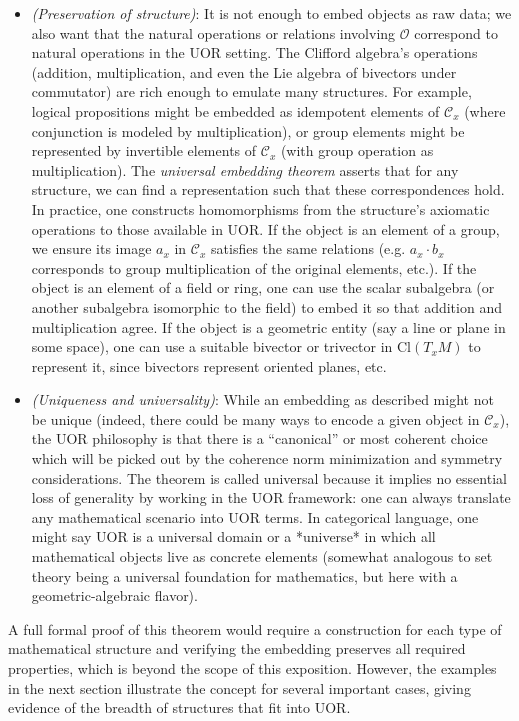 \documentclass[12pt]{article}
\newcommand{\Cl}{\mathrm{Cl}}
\begin{document}
\begin{itemize}
\begin{itemize}
       \item \textit{(Preservation of structure)}: It is not enough to embed objects as raw data; we also want that the natural operations or relations involving $\mathcal{O}$ correspond to natural operations in the UOR setting. The Clifford algebra’s operations (addition, multiplication, and even the Lie algebra of bivectors under commutator) are rich enough to emulate many structures. For example, logical propositions might be embedded as idempotent elements of $\mathcal{C}_x$ (where conjunction is modeled by multiplication), or group elements might be represented by invertible elements of $\mathcal{C}_x$ (with group operation as multiplication). The \textit{universal embedding theorem} asserts that for any structure, we can find a representation such that these correspondences hold. In practice, one constructs homomorphisms from the structure’s axiomatic operations to those available in UOR. If the object is an element of a group, we ensure its image $a_x$ in $\mathcal{C}_x$ satisfies the same relations (e.g. $a_x \cdot b_x$ corresponds to group multiplication of the original elements, etc.). If the object is an element of a field or ring, one can use the scalar subalgebra (or another subalgebra isomorphic to the field) to embed it so that addition and multiplication agree. If the object is a geometric entity (say a line or plane in some space), one can use a suitable bivector or trivector in $\Cl(T_xM)$ to represent it, since bivectors represent oriented planes, etc.
       \item \textit{(Uniqueness and universality)}: While an embedding as described might not be unique (indeed, there could be many ways to encode a given object in $\mathcal{C}_x$), the UOR philosophy is that there is a “canonical” or most coherent choice which will be picked out by the coherence norm minimization and symmetry considerations. The theorem is called universal because it implies no essential loss of generality by working in the UOR framework: one can always translate any mathematical scenario into UOR terms. In categorical language, one might say UOR is a universal domain or a *universe* in which all mathematical objects live as concrete elements (somewhat analogous to set theory being a universal foundation for mathematics, but here with a geometric-algebraic flavor).
    \end{itemize}
    A full formal proof of this theorem would require a construction for each type of mathematical structure and verifying the embedding preserves all required properties, which is beyond the scope of this exposition. However, the examples in the next section illustrate the concept for several important cases, giving evidence of the breadth of structures that fit into UOR.
\end{itemize}
\end{document}
